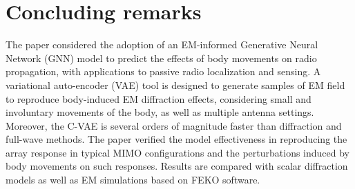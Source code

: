 \section{Concluding remarks}
\label{sec:conclusions}
The paper considered the adoption of an EM-informed Generative Neural Network (GNN) model to predict the effects of body movements on radio propagation, with applications to passive radio localization and sensing. A variational auto-encoder (VAE) tool is designed to generate samples of EM field to reproduce body-induced EM diffraction effects, considering small and involuntary movements of the body, as well as multiple antenna settings. Moreover, the C-VAE is several orders of magnitude faster than diffraction and full-wave methods. The paper verified the model effectiveness in reproducing the array response in typical MIMO configurations and the perturbations induced by body movements on such responses. Results are compared with scalar diffraction models as well as EM simulations based on FEKO\textsuperscript{\textregistered} software.

